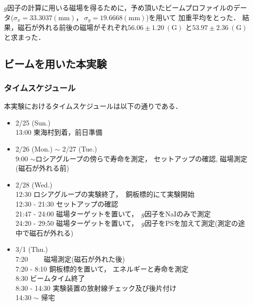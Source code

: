 $g$因子の計算に用いる磁場を得るために，予め頂いたビームプロファイルのデータ($\sigma_x=33.3037(\mathrm{mm})，\ \sigma_y=19.6668(\mathrm{mm})$)を用いて
加重平均をとった．
結果，磁石が外れる前後の磁場がそれぞれ$56.06\pm 1.20\  (\mathrm{G})$ と$53.97\pm 2.36\  (\mathrm{G})$ と求まった．
\newpage
\subsection{ビームを用いた本実験}
\subsubsection{タイムスケジュール}
本実験におけるタイムスケジュールは以下の通りである．
\begin{itemize}
\item 2/25 (Sun.)\\
  13:00   東海村到着，前日準備
\item 2/26 (Mon.) $\sim$ 2/27 (Tue.)\\
  9:00 $\sim$ロシアグループの傍らで寿命を測定， セットアップの確認, 磁場測定(磁石が外れる前)
\item 2/28 (Wed.)\\
  12:30   ロシアグループの実験終了，\ 銅板標的にて実験開始\\ 
  12:30 - 21:30 セットアップの確認\\
  21:47 - 24:00 磁場ターゲットを置いて，\ $g$因子をNaIのみで測定\\
  24:20 - 29:50 磁場ターゲットを置いて，\ $g$因子をPSを加えて測定(測定の途中で磁石が外れる)
\item 3/1 (Thu.)\\
  7:20 　　磁場測定(磁石が外れた後)\\
  7:20 - 8:10 銅板標的を置いて， エネルギーと寿命を測定\\
  8:30   ビームタイム終了\\
  8:30 - 14:30 実験装置の放射線チェック及び後片付け \\
  14:30 $\sim$ 帰宅
\end{itemize}
